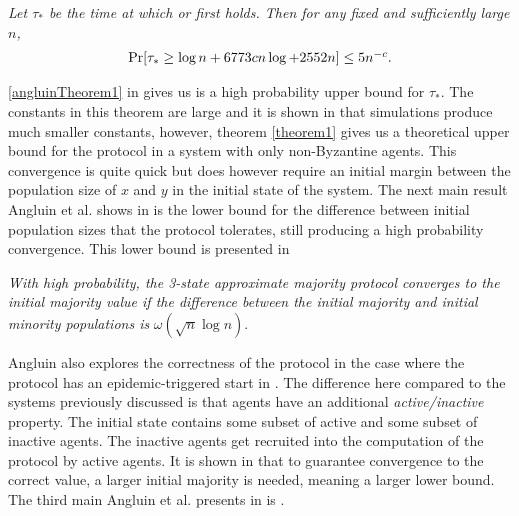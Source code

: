  \begin{theorem}
    \textit{Let $\tau_*$ be the time at which  or  first holds. Then for any fixed  and sufficiently large $n$,}
    \begin{align}
        \centerline{$\Pr[\tau_* \geq \log n + 6773cn \log + 2552n] \leq 5n^{-c}$.}  \label{angluinTheorem1} 
    \end{align}
 \end{theorem}

\ref{angluinTheorem1} in  gives us is a high probability upper bound for $\tau_*$. The constants in this theorem are large and it is shown in \cite{angluinSimplePopulationProtocol2008} that simulations produce much smaller constants, however, theorem \ref{theorem1} gives us a theoretical upper bound for the protocol in a system with only non-Byzantine agents. This convergence is quite quick but does however require an initial margin between the population size of $x$ and $y$ in the initial state of the system. The next main result Angluin et al. shows in \cite{angluinSimplePopulationProtocol2008} is the lower bound for the difference between initial population sizes that the protocol tolerates, still producing a high probability convergence. This lower bound is presented in 


 \begin{theorem}
    \textit{With high probability, the 3-state approximate majority protocol converges to the initial majority value if the difference between the initial majority and initial minority populations is } $\omega(\sqrt{n} \log n)$.
 \end{theorem} 

 Angluin also explores the correctness of the protocol in the case where the protocol has an epidemic-triggered start in \cite{angluinSimplePopulationProtocol2008}. The difference here compared to the systems previously discussed is that agents have an additional \emph{active/inactive} property. The initial state contains some subset of active and some subset of inactive agents. The inactive agents get recruited into the computation of the protocol by active agents. It is shown in \cite{angluinSimplePopulationProtocol2008} that to guarantee convergence to the correct value, a larger initial majority is needed, meaning a larger lower bound. The third main Angluin et al. presents in \cite{angluinSimplePopulationProtocol2008} is .

